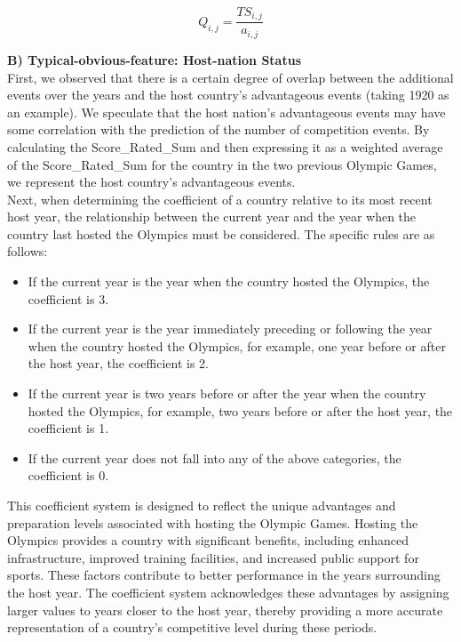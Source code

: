 \documentclass[12pt]{article}
\begin{document}
\begin{equation}\label{eq3}
    Q_{i,j} = \frac{TS_{i,j}}{a_{i,j}}
\end{equation}

\noindent \textbf{B) Typical-obvious-feature: Host-nation Status}\\

First, we observed that there is a certain degree of overlap between the additional events over the years and the host country's advantageous events (taking 1920 as an example). We speculate that the host nation's advantageous events may have some correlation with the prediction of the number of competition events. By calculating the Score\_Rated\_Sum and then expressing it as a weighted average of the Score\_Rated\_Sum for the country in the two previous Olympic Games, we represent the host country's advantageous events.\\

Next, when determining the coefficient of a country relative to its most recent host year, the relationship between the current year and the year when the country last hosted the Olympics must be considered. The specific rules are as follows:

\begin{itemize}
    \item If the current year is the year when the country hosted the Olympics, the coefficient is 3.
    \item If the current year is the year immediately preceding or following the year when the country hosted the Olympics, for example, one year before or after the host year, the coefficient is 2.
    \item If the current year is two years before or after the year when the country hosted the Olympics, for example, two years before or after the host year, the coefficient is 1.
    \item If the current year does not fall into any of the above categories, the coefficient is 0.
\end{itemize}

This coefficient system is designed to reflect the unique advantages and preparation levels associated with hosting the Olympic Games. Hosting the Olympics provides a country with significant benefits, including enhanced infrastructure, improved training facilities, and increased public support for sports. These factors contribute to better performance in the years surrounding the host year. The coefficient system acknowledges these advantages by assigning larger values to years closer to the host year, thereby providing a more accurate representation of a country's competitive level during these periods.
\end{document}
